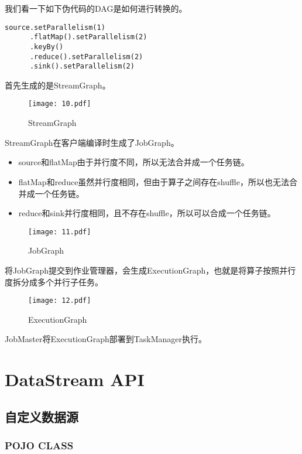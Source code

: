 \documentclass[cn,11pt,chinese]{elegantbook}
\begin{document}
我们看一下如下伪代码的DAG是如何进行转换的。

\begin{lstlisting}
source.setParallelism(1)
      .flatMap().setParallelism(2)
      .keyBy()
      .reduce().setParallelism(2)
      .sink().setParallelism(2)  
\end{lstlisting}

首先生成的是StreamGraph。

\begin{figure}[htbp]
  \centering
  \texttt{[image: 10.pdf]}
  \caption{StreamGraph}
\end{figure}

StreamGraph在客户端编译时生成了JobGraph。

\begin{itemize}
  \item source和flatMap由于并行度不同，所以无法合并成一个任务链。
  \item flatMap和reduce虽然并行度相同，但由于算子之间存在shuffle，所以也无法合并成一个任务链。
  \item reduce和sink并行度相同，且不存在shuffle，所以可以合成一个任务链。
\end{itemize}

\begin{figure}[htbp]
  \centering
  \texttt{[image: 11.pdf]}
  \caption{JobGraph}
\end{figure}

将JobGraph提交到作业管理器，会生成ExecutionGraph，也就是将算子按照并行度拆分成多个并行子任务。

\begin{figure}[htbp]
  \centering
  \texttt{[image: 12.pdf]}
  \caption{ExecutionGraph}
\end{figure}

JobMaster将ExecutionGraph部署到TaskManager执行。

\chapter{DataStream API}

\section{自定义数据源}

\subsection{POJO CLASS}
\end{document}
